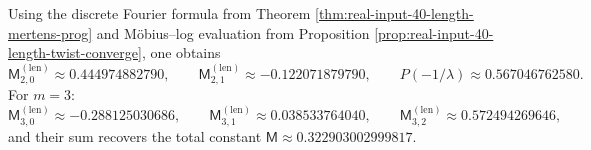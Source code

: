 \begin{remark}[Auditable numerical anchors: length congruence constants for \texorpdfstring{$m=2,3$}{m=2,3}]\label{rem:real-input-40-length-mertens-numeric}
Using the discrete Fourier formula from Theorem \ref{thm:real-input-40-length-mertens-prog} and Möbius--log evaluation from Proposition \ref{prop:real-input-40-length-twist-converge}, one obtains
\[
\mathsf{M}^{(\mathrm{len})}_{2,0}\approx 0.444974882790,\qquad
\mathsf{M}^{(\mathrm{len})}_{2,1}\approx -0.122071879790,
\qquad
P(-1/\lambda)\approx 0.567046762580.
\]
For \(m=3\):
\[
\mathsf{M}^{(\mathrm{len})}_{3,0}\approx -0.288125030686,\qquad
\mathsf{M}^{(\mathrm{len})}_{3,1}\approx 0.038533764040,\qquad
\mathsf{M}^{(\mathrm{len})}_{3,2}\approx 0.572494269646,
\]
and their sum recovers the total constant \(\mathsf{M}\approx 0.322903002999817\).
\end{remark}




